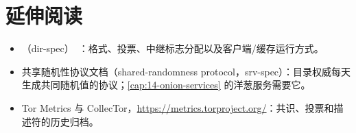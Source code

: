 \section*{延伸阅读}
\begin{itemize}
  \item {}（dir-spec）~\cite{torspec}：格式、投票、中继标志分配以及客户端/缓存运行方式。
  \item 共享随机性协议文档（shared-randomness protocol，srv-spec）：目录权威每天生成共同随机值的协议；\cref{cap:14-onion-services} 的洋葱服务需要它。
  \item Tor Metrics 与 CollecTor，\url{https://metrics.torproject.org/}：共识、投票和描述符的历史归档。
\end{itemize}
